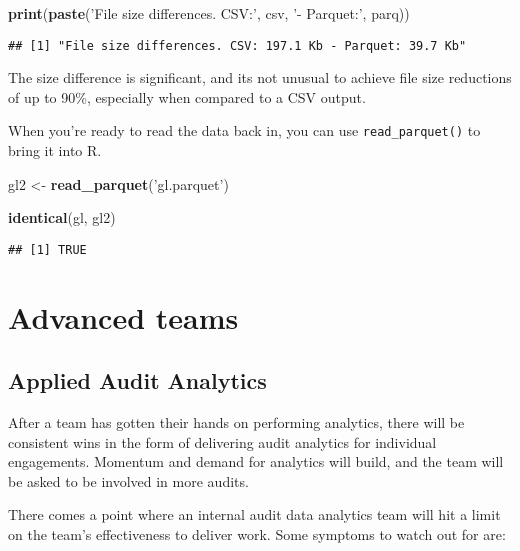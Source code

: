 \documentclass[
]{book}
\newenvironment{Shaded}{\begin{snugshade}}{\end{snugshade}}
\newcommand{\KeywordTok}[1]{\textcolor[rgb]{0.13,0.29,0.53}{\textbf{#1}}}
\newcommand{\NormalTok}[1]{#1}
\newcommand{\StringTok}[1]{\textcolor[rgb]{0.31,0.60,0.02}{#1}}
\begin{document}
\begin{Shaded}
\begin{Highlighting}[]
\KeywordTok{print}\NormalTok{(}\KeywordTok{paste}\NormalTok{(}\StringTok{'File size differences. CSV:'}\NormalTok{, csv, }\StringTok{'- Parquet:'}\NormalTok{, parq))}
\end{Highlighting}
\end{Shaded}

\begin{verbatim}
## [1] "File size differences. CSV: 197.1 Kb - Parquet: 39.7 Kb"
\end{verbatim}

The size difference is significant, and its not unusual to achieve file size reductions of up to 90\%, especially when compared to a CSV output.

When you're ready to read the data back in, you can use \texttt{read\_parquet()} to bring it into R.

\begin{Shaded}
\begin{Highlighting}[]
\NormalTok{gl2 <-}\StringTok{ }\KeywordTok{read_parquet}\NormalTok{(}\StringTok{'gl.parquet'}\NormalTok{)}

\KeywordTok{identical}\NormalTok{(gl, gl2)}
\end{Highlighting}
\end{Shaded}

\begin{verbatim}
## [1] TRUE
\end{verbatim}

\hypertarget{part-advanced-teams}{%
\part{Advanced teams}\label{part-advanced-teams}}

\hypertarget{applied-audit-analytics}{%
\chapter{Applied Audit Analytics}\label{applied-audit-analytics}}

After a team has gotten their hands on performing analytics, there will be consistent wins in the form of delivering audit analytics for individual engagements. Momentum and demand for analytics will build, and the team will be asked to be involved in more audits.

There comes a point where an internal audit data analytics team will hit a limit on the team's effectiveness to deliver work. Some symptoms to watch out for are:
\end{document}
